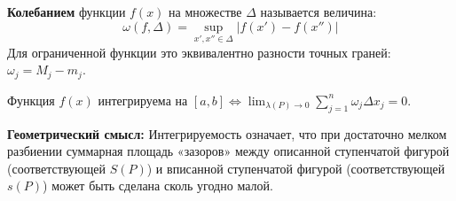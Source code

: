 \begin{definition}
\textbf{Колебанием} функции $f(x)$ на множестве $\Delta$ называется величина:
\[ \omega(f, \Delta) = \sup_{x', x'' \in \Delta} | f(x') - f(x'') | \]
Для ограниченной функции это эквивалентно разности точных граней: $\omega_j = M_j - m_j$.
\end{definition}

\begin{consequence}
Функция $f(x)$ интегрируема на $[a, b] \iff \lim_{\lambda(P) \to 0} \sum_{j=1}^n \omega_j \Delta x_j = 0$.
\end{consequence}

\textbf{Геометрический смысл:}
Интегрируемость означает, что при достаточно мелком разбиении суммарная площадь «зазоров» между описанной ступенчатой фигурой (соответствующей $S(P)$) и вписанной ступенчатой фигурой (соответствующей $s(P)$) может быть сделана сколь угодно малой.


